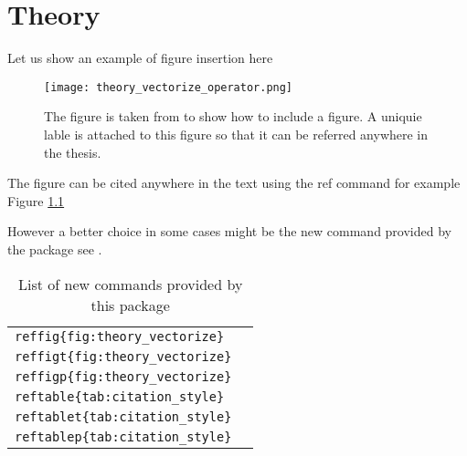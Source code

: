\chapter{Theory}

Let us show an example of figure insertion here
\begin{figure}
	\center
	\texttt{[image: theory\_vectorize\_operator.png]}
	\caption{The figure is taken from  \cite{malkoti_algorithm_2018} 
	to show how to include a figure. 
	A uniquie lable  is attached to this figure so that it can be 
	referred anywhere in the thesis.}
	\label{fig:theory_vectorize}
\end{figure}




The figure can be cited anywhere in the text using the ref command 
for example  Figure \ref{fig:theory_vectorize}

However a better choice in some cases might be the new command provided by the package 
see .  

%
\begin{table}
\caption{ List of new commands provided by this package}
\label{tab:list_ref_cmd}
\center
\begin{tabular}{cc}
	\hline
	\verb|reffig{fig:theory_vectorize} |		&	{fig:theory_vectorize} 	\\
	\verb|reffigt{fig:theory_vectorize}|		&	{fig:theory_vectorize}	\\
	\verb|reffigp{fig:theory_vectorize}|		& 	{fig:theory_vectorize}	\\
	\verb|reftable{tab:citation_style} |		&	{tab:citation_style} \\
	\verb|reftablet{tab:citation_style}|		&	{tab:citation_style}	\\
	\verb|reftablep{tab:citation_style}|		&  	{tab:citation_style} \\
	\hline
\end{tabular}
\end{table} 

 
  